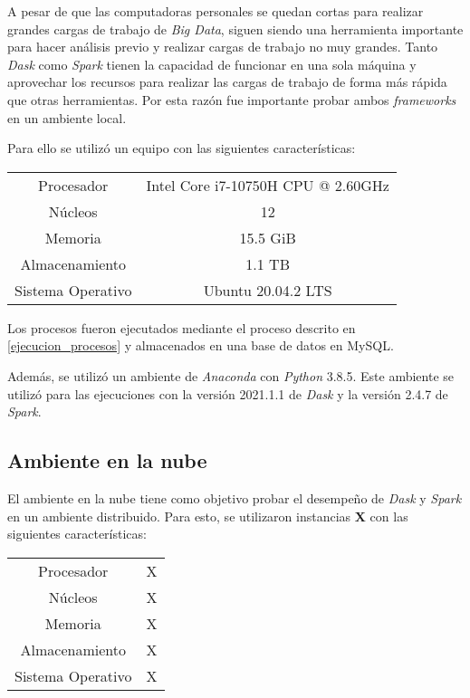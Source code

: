 A pesar de que las computadoras personales se quedan cortas para realizar grandes cargas de trabajo de \textit{Big Data}, siguen siendo una herramienta importante para hacer análisis previo y realizar cargas de trabajo no muy grandes. Tanto \textit{Dask} como \textit{Spark} tienen la capacidad de funcionar en una sola máquina y aprovechar los recursos para realizar las cargas de trabajo de forma más rápida que otras herramientas. Por esta razón fue importante probar ambos \textit{frameworks} en un ambiente local. 

Para ello se utilizó un equipo con las siguientes características:

\begin{center}
\begin{tabular}{|c|c|}
 \hline
  Procesador & Intel Core i7-10750H CPU @ 2.60GHz \\ 
  Núcleos & 12 \\
  Memoria & 15.5 GiB \\ 
  Almacenamiento & 1.1 TB \\ 
  Sistema Operativo & Ubuntu 20.04.2 LTS \\
  \hline
\end{tabular}
\end{center}

Los procesos fueron ejecutados mediante el proceso descrito en \ref{ejecucion_procesos} y almacenados en una base de datos en MySQL.

Además, se utilizó un ambiente de \textit{Anaconda} con \textit{Python} 3.8.5. Este ambiente se utilizó para las ejecuciones con la versión 2021.1.1 de \textit{Dask} y la versión 2.4.7 de \textit{Spark}. 

\subsection{Ambiente en la nube}

El ambiente en la nube tiene como objetivo probar el desempeño de \textit{Dask} y \textit{Spark} en un ambiente distribuido. Para esto, se utilizaron instancias \textbf{X} con las siguientes características:

\begin{center}
\begin{tabular}{|c|c|}
 \hline
  Procesador & X \\ 
  Núcleos & X \\
  Memoria & X \\ 
  Almacenamiento & X \\ 
  Sistema Operativo & X \\
  \hline
\end{tabular}
\end{center}

